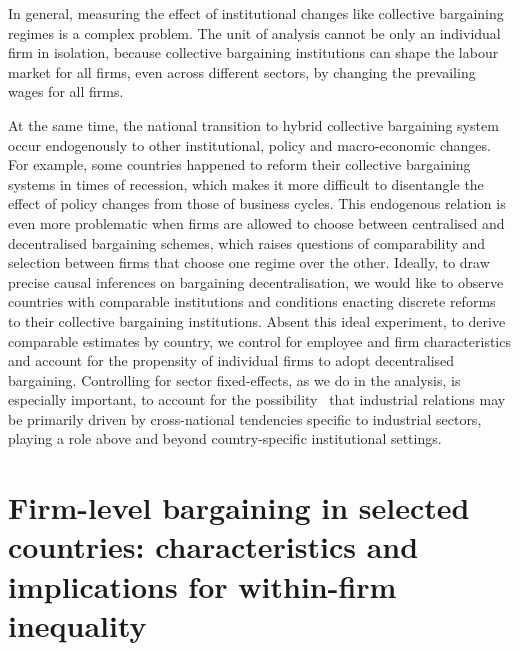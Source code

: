 \documentclass[12pt]{article}
\begin{document}
In general, measuring the effect of institutional changes like collective bargaining regimes is a complex problem. The unit of analysis cannot be only an individual firm in isolation, because collective bargaining institutions can shape the labour market for all firms, even across different sectors, by changing the prevailing wages for all firms.

At the same time, the national transition to hybrid collective bargaining system occur endogenously to other institutional, policy and macro-economic changes. For example, some countries happened to reform their collective bargaining systems in times of recession, which makes it more difficult to disentangle the effect of policy changes from those of business cycles. This endogenous relation is even more problematic when firms are allowed to choose between centralised and decentralised bargaining schemes, which raises questions of comparability and selection between firms that choose one regime over the other. Ideally, to draw precise causal inferences on bargaining decentralisation, we would like to observe countries with comparable institutions and conditions enacting discrete reforms to their collective bargaining institutions. Absent this ideal experiment, to derive comparable estimates by country, we control for employee and firm characteristics and account for the propensity of individual firms to adopt decentralised bargaining. Controlling for sector fixed-effects, as we do in the analysis, is especially important, to account for the possibility~\citep[put forward in][]{bechter2012sectors,hassel2014paradox} that industrial relations may be primarily driven by cross-national tendencies specific to industrial sectors, playing a role above and beyond country-specific institutional settings.


\section{Firm-level bargaining in selected countries: characteristics and implications for within-firm inequality}
\label{sec:bargaining_models}
\end{document}
